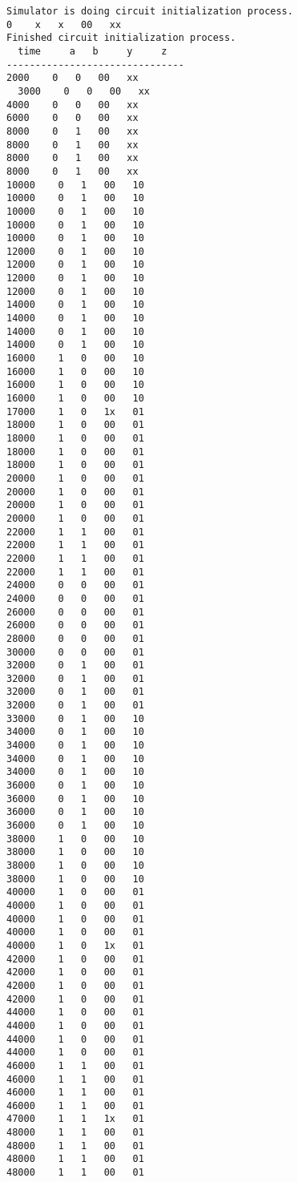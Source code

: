 \documentclass[paper=usletter, fontsize=12pt]{article}
\begin{document}
\begin{lstlisting}[language={}]
Simulator is doing circuit initialization process.
0    x   x   00   xx
Finished circuit initialization process.
  time     a   b     y     z   
-------------------------------
2000    0   0   00   xx
  3000    0   0   00   xx
4000    0   0   00   xx
6000    0   0   00   xx
8000    0   1   00   xx
8000    0   1   00   xx
8000    0   1   00   xx
8000    0   1   00   xx
10000    0   1   00   10
10000    0   1   00   10
10000    0   1   00   10
10000    0   1   00   10
10000    0   1   00   10
12000    0   1   00   10
12000    0   1   00   10
12000    0   1   00   10
12000    0   1   00   10
14000    0   1   00   10
14000    0   1   00   10
14000    0   1   00   10
14000    0   1   00   10
16000    1   0   00   10
16000    1   0   00   10
16000    1   0   00   10
16000    1   0   00   10
17000    1   0   1x   01
18000    1   0   00   01
18000    1   0   00   01
18000    1   0   00   01
18000    1   0   00   01
20000    1   0   00   01
20000    1   0   00   01
20000    1   0   00   01
20000    1   0   00   01
22000    1   1   00   01
22000    1   1   00   01
22000    1   1   00   01
22000    1   1   00   01
24000    0   0   00   01
24000    0   0   00   01
26000    0   0   00   01
26000    0   0   00   01
28000    0   0   00   01
30000    0   0   00   01
32000    0   1   00   01
32000    0   1   00   01
32000    0   1   00   01
32000    0   1   00   01
33000    0   1   00   10
34000    0   1   00   10
34000    0   1   00   10
34000    0   1   00   10
34000    0   1   00   10
36000    0   1   00   10
36000    0   1   00   10
36000    0   1   00   10
36000    0   1   00   10
38000    1   0   00   10
38000    1   0   00   10
38000    1   0   00   10
38000    1   0   00   10
40000    1   0   00   01
40000    1   0   00   01
40000    1   0   00   01
40000    1   0   00   01
40000    1   0   1x   01
42000    1   0   00   01
42000    1   0   00   01
42000    1   0   00   01
42000    1   0   00   01
44000    1   0   00   01
44000    1   0   00   01
44000    1   0   00   01
44000    1   0   00   01
46000    1   1   00   01
46000    1   1   00   01
46000    1   1   00   01
46000    1   1   00   01
47000    1   1   1x   01
48000    1   1   00   01
48000    1   1   00   01
48000    1   1   00   01
48000    1   1   00   01
\end{lstlisting}
\end{document}
